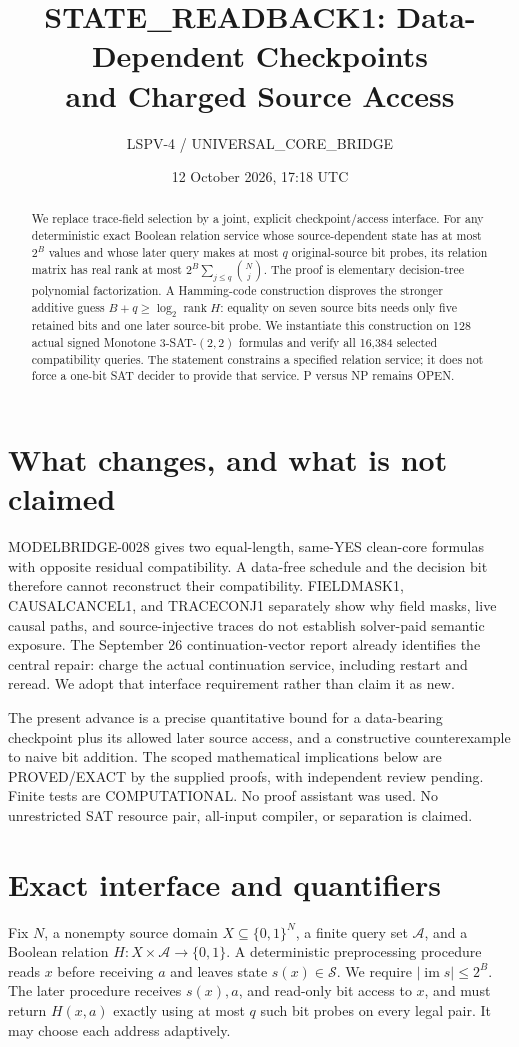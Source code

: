 \documentclass[11pt]{article}
\title{STATE\_READBACK1: Data-Dependent Checkpoints\\and Charged Source Access}
\author{LSPV-4 / UNIVERSAL\_CORE\_BRIDGE}
\date{12 October 2026, 17:18 UTC}
\newcommand{\rank}{\operatorname{rank}}
\begin{document}
\maketitle
\begin{abstract}
We replace trace-field selection by a joint, explicit checkpoint/access
interface. For any deterministic exact Boolean relation service whose
source-dependent state has at most $2^B$ values and whose later query makes
at most $q$ original-source bit probes, its relation matrix has real rank at
most $2^B\sum_{j\le q}\binom Nj$. The proof is elementary decision-tree
polynomial factorization. A Hamming-code construction disproves the
stronger additive guess $B+q\ge\log_2\rank H$: equality on seven source
bits needs only five retained bits and one later source-bit probe.
We instantiate this construction on 128 actual signed Monotone
3-SAT-$(2,2)$ formulas and verify all 16,384 selected compatibility queries.
The statement constrains a specified relation service; it does not force a
one-bit SAT decider to provide that service. P versus NP remains OPEN.
\end{abstract}

\section{What changes, and what is not claimed}
MODELBRIDGE-0028 gives two equal-length, same-YES clean-core formulas with
opposite residual compatibility. A data-free schedule and the decision bit
therefore cannot reconstruct their compatibility. FIELDMASK1, CAUSALCANCEL1,
and TRACECONJ1 separately show why field masks, live causal paths, and
source-injective traces do not establish solver-paid semantic exposure.
The September 26 continuation-vector report already identifies the central
repair: charge the actual continuation service, including restart and reread.
We adopt that interface requirement rather than claim it as new.

The present advance is a precise quantitative bound for a data-bearing
checkpoint plus its allowed later source access, and a constructive
counterexample to naive bit addition. The scoped mathematical implications
below are PROVED/EXACT by the supplied proofs, with independent review
pending. Finite tests are COMPUTATIONAL. No proof assistant was used. No
unrestricted SAT resource pair, all-input compiler, or separation is claimed.

\section{Exact interface and quantifiers}
Fix $N$, a nonempty source domain $X\subseteq\{0,1\}^N$, a finite query set
$\mathcal A$, and a Boolean relation $H:X\times\mathcal A\to\{0,1\}$.
A deterministic preprocessing procedure reads $x$ before receiving $a$ and
leaves state $s(x)\in\mathcal S$. We require $|\operatorname{im}s|\le2^B$.
The later procedure receives $s(x),a$, and read-only bit access to $x$, and
must return $H(x,a)$ exactly using at most $q$ such bit probes on every legal
pair. It may choose each address adaptively.
\end{document}
